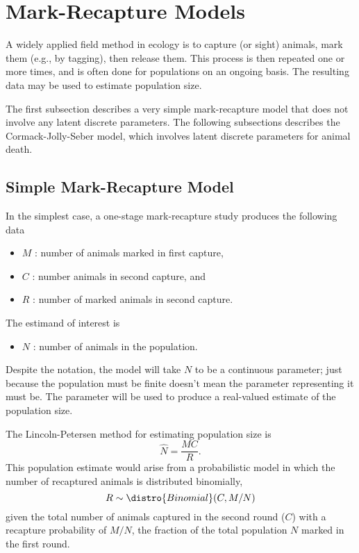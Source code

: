\section{Mark-Recapture Models}

A widely applied field method in ecology is to capture (or sight)
animals, mark them (e.g., by tagging), then release them.  This
process is then repeated one or more times, and is often done for
populations on an ongoing basis.  The resulting data may be used to
estimate population size.

The first subsection describes a very simple mark-recapture model that does
not involve any latent discrete parameters.  The following subsections
describes the Cormack-Jolly-Seber model, which involves latent
discrete parameters for animal death.

\subsection{Simple Mark-Recapture Model}

In the simplest case, a one-stage mark-recapture study produces the
following data
%
\begin{itemize}
\item $M$ : number of animals marked in first capture,
\item $C$ : number animals in second capture, and
\item $R$ : number of marked animals in second capture.
\end{itemize}
%
The estimand of interest is
%
\begin{itemize}
\item $N$ : number of animals in the population.
\end{itemize}
%
Despite the notation, the model will take $N$ to be a continuous
parameter; just because the population must be finite doesn't mean the
parameter representing it must be.  The parameter will be used to
produce a real-valued estimate of the population size.

The Lincoln-Petersen \citep{Lincoln:1930,Petersen:1896} method for
estimating population size is
%
\[
\hat{N} = \frac{M C}{R}.
\]
%
This population estimate would arise from a probabilistic model in
which the number of recaptured animals is distributed binomially,
\[
R \sim \distro{Binomial}(C, M / N)
\]
given the total number of animals captured in the second round ($C$)
with a recapture probability of $M/N$, the fraction of the total
population $N$ marked in the first round.

